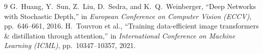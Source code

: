 \documentclass[11pt,a4paper]{article}
\theoremstyle{definition}
\begin{document}
\begin{thebibliography}{9}
 G.~Huang, Y.~Sun, Z.~Liu, D.~Sedra, and K.~Q.~Weinberger, ``Deep Networks with Stochastic Depth,'' in \emph{European Conference on Computer Vision (ECCV)}, pp.~646--661, 2016.
 H.~Touvron et al., ``Training data-efficient image transformers & distillation through attention,'' in \emph{International Conference on Machine Learning (ICML)}, pp.~10347--10357, 2021.
\end{thebibliography}
\end{document}
